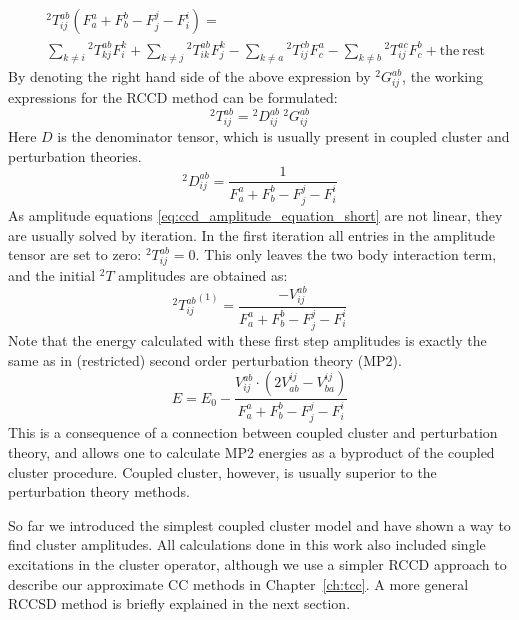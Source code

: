 %
\begin{equation}
\begin{aligned}
 & {}^2T_{ij}^{ab} (F_{a}^{a} + F_{b}^{b} - F_{j}^{j} - F_{i}^{i}) = \\
 & \sum_{k\neq i} {}^{2}T^{ab}_{kj} F^{k}_{i}
+ \sum_{k \neq j} {}^{2}T^{ab}_{ik} F^{k}_{j}
- \sum_{k \neq a} {}^{2}T^{cb}_{ij} F^{a}_{c}
- \sum_{k \neq b} {}^{2}T^{ac}_{ij} F^{b}_{c} + \mathrm{the~rest} 
\end{aligned}
\label{eq:ccd_splitting}
\end{equation}
%
By denoting the right hand side of the above expression by ${}^{2}G_{ij}^{ab}$, 
the working expressions for the RCCD method can be formulated:
%
\begin{equation}
{}^{2}T_{ij}^{ab} = {}^{2}D_{ij}^{ab} ~ {}^{2}G_{ij}^{ab}
\label{eq:ccd_amplitude_equation_short}
\end{equation}
%
Here $D$ is the denominator tensor, which is usually present in coupled cluster 
and perturbation theories.
%
\begin{equation}
 {}^{2}D_{ij}^{ab} = \frac{1}{F_{a}^{a} + F_{b}^{b} - F_{j}^{j} - 
F_{i}^{i}}
\label{eq:cc_denom_definition}
\end{equation}
As amplitude equations 
\ref{eq:ccd_amplitude_equation_short} are 
not linear, they are usually solved by iteration. In the first iteration all 
entries in the amplitude tensor are set to zero: ${}^{2}T_{ij}^{ab} = 0$. This 
only leaves the two body interaction term, and the initial ${}^2T$ amplitudes 
are 
obtained as:
%
\begin{equation}
 {}^{2}{T_{ij}^{ab}}^{(1)} =  \frac{-V^{ab}_{ij}}{F_{a}^{a} + F_{b}^{b} - 
F_{j}^{j} - F_{i}^{i}}
\end{equation}
%
Note that the energy calculated with these first step amplitudes is exactly the 
same as in (restricted) second order perturbation theory (MP2).
%
\begin{equation}
 E = E_{0} -  \frac{V^{ab}_{ij} \cdot (2 V^{ij}_{ab} - 
V^{ij}_{ba})}{F_{a}^{a} + F_{b}^{b} - 
F_{j}^{j} - F_{i}^{i}}
\end{equation}
%
This is a consequence of a connection between coupled cluster and perturbation 
theory, and allows one to calculate MP2 energies as a byproduct of the coupled 
cluster procedure. Coupled cluster, however, is usually superior to the 
perturbation theory methods. 

So far we introduced the simplest coupled cluster model and have shown a way to 
find cluster amplitudes. All calculations done in this work also included 
single excitations in the cluster operator, although we use a simpler RCCD 
approach to describe our approximate CC methods in Chapter~\ref{ch:tcc}. A more 
general RCCSD method is briefly explained in the next section.

